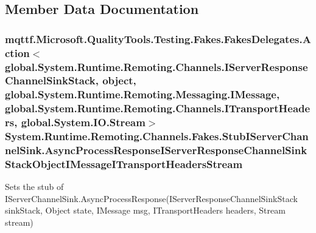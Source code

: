 \subsection{Member Data Documentation}
\hypertarget{class_system_1_1_runtime_1_1_remoting_1_1_channels_1_1_fakes_1_1_stub_i_server_channel_sink_a08c066b78c801f475499fc94476a4e5e}{
\subsubsection[{Async\-Process\-Response\-I\-Server\-Response\-Channel\-Sink\-Stack\-Object\-I\-Message\-I\-Transport\-Headers\-Stream}]{\setlength{\rightskip}{0pt plus 5cm}mqttf.\-Microsoft.\-Quality\-Tools.\-Testing.\-Fakes.\-Fakes\-Delegates.\-Action$<$global.\-System.\-Runtime.\-Remoting.\-Channels.\-I\-Server\-Response\-Channel\-Sink\-Stack, object, global.\-System.\-Runtime.\-Remoting.\-Messaging.\-I\-Message, global.\-System.\-Runtime.\-Remoting.\-Channels.\-I\-Transport\-Headers, global.\-System.\-I\-O.\-Stream$>$ System.\-Runtime.\-Remoting.\-Channels.\-Fakes.\-Stub\-I\-Server\-Channel\-Sink.\-Async\-Process\-Response\-I\-Server\-Response\-Channel\-Sink\-Stack\-Object\-I\-Message\-I\-Transport\-Headers\-Stream}}\label{class_system_1_1_runtime_1_1_remoting_1_1_channels_1_1_fakes_1_1_stub_i_server_channel_sink_a08c066b78c801f475499fc94476a4e5e}


Sets the stub of I\-Server\-Channel\-Sink.\-Async\-Process\-Response(\-I\-Server\-Response\-Channel\-Sink\-Stack sink\-Stack, Object state, I\-Message msg, I\-Transport\-Headers headers, Stream stream)

